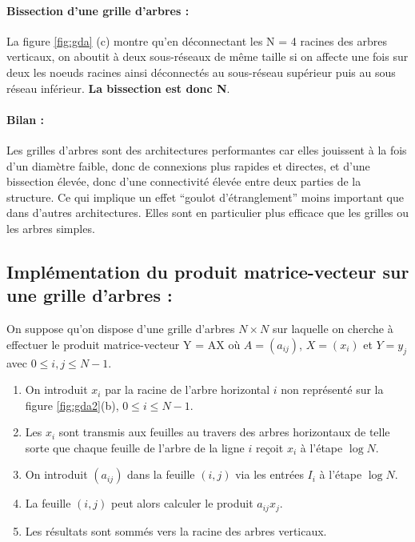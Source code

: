 \paragraph{Bissection d'une grille d'arbres : } La figure \ref{fig:gda} (c) montre qu'en déconnectant les N = 4 racines des arbres verticaux, 
on aboutit à deux sous-réseaux de même taille si on affecte une fois sur deux les noeuds racines ainsi déconnectés au
sous-réseau supérieur puis au sous réseau inférieur. \textbf{La bissection est donc N}.

\paragraph{Bilan : } Les grilles d'arbres sont des architectures performantes car elles jouissent à la fois d'un diamètre faible, donc de connexions 
plus rapides et directes, et d'une bissection élevée, donc d'une connectivité élevée entre deux parties de la structure. 
Ce qui implique un effet ``goulot d'étranglement'' moins important que dans d'autres architectures.
Elles sont en particulier plus efficace que les grilles ou les arbres simples.




\subsection{Implémentation du produit matrice-vecteur sur une grille d'arbres : }

On suppose qu'on dispose d'une grille d'arbres $N \times N$ sur laquelle on cherche à effectuer le produit matrice-vecteur Y = AX où $A = (a_{ij})$, $X = (x_i)$
et $Y=y_j$ avec $0\leq i,j\leq N-1$. 


\begin{enumerate}
 \item On introduit $x_i$ par la racine de l'arbre horizontal $i$ non représenté sur la figure \ref{fig:gda2}(b), $0\leq i\leq N-1$. 
 \item Les $x_i$ sont transmis aux feuilles au travers des arbres horizontaux de telle 
 sorte que chaque feuille de l'arbre de la ligne $i$ 
 reçoit $x_i$ à l'étape $\log N$.
 \item On introduit $(a_{ij})$ dans la feuille $(i,j)$ via les entrées $I_i$ à l'étape $\log N$. 
 \item La feuille $(i,j)$ peut alors calculer le produit $a_{ij}x_j$.
 \item Les résultats sont sommés vers la racine des arbres verticaux.
\end{enumerate}



